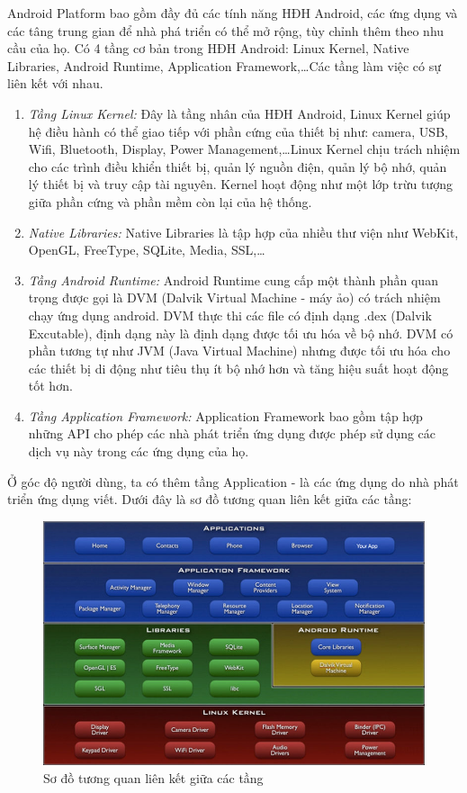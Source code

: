 Android Platform bao gồm đầy đủ các tính năng HĐH Android, các ứng dụng và các tâng trung gian để nhà phá triển có thể mở rộng, tùy chỉnh thêm theo nhu cầu của họ. Có 4 tầng cơ bản trong HĐH Android: Linux Kernel, Native Libraries, Android Runtime, Application Framework,\dots Các tầng làm việc có sự liên kết với nhau.
\begin{enumerate}
    \item{\textit{Tầng Linux Kernel:}}
    Đây là tầng nhân của HĐH Android, Linux Kernel giúp hệ điều hành có thể giao tiếp với phần cứng của thiết bị như: camera,  USB, Wifi, Bluetooth, Display, Power Management,\dots  Linux Kernel chịu trách nhiệm cho các trình điều khiển thiết bị, quản lý nguồn điện, quản lý bộ nhớ, quản lý thiết bị và truy cập tài nguyên. Kernel hoạt động như một lớp trừu tượng giữa phần cứng và phần mềm còn lại của hệ thống.
    \item{\textit{Native Libraries:}}
    Native Libraries là tập hợp của nhiều thư viện như WebKit, OpenGL, FreeType, SQLite, Media, SSL,\dots 
    \item{\textit{Tầng Android Runtime:}}
    Android Runtime cung cấp một thành phần quan trọng được gọi là DVM (Dalvik Virtual Machine - máy ảo) có trách nhiệm chạy ứng dụng android.
    DVM thực thi các file có định dạng .dex (Dalvik Excutable), định dạng này là định dạng được tối ưu hóa về bộ nhớ.
    \newline
    DVM có phần tương tự như JVM (Java Virtual Machine) nhưng được tối ưu hóa cho các thiết bị di động như tiêu thụ ít bộ nhớ hơn và tăng hiệu suất hoạt động tốt hơn.
    \item{\textit{Tầng Application Framework:}}
    Application Framework bao gồm tập hợp những API cho phép các nhà phát triển ứng dụng được phép sử dụng các dịch vụ này trong các ứng dụng của họ.
\end{enumerate}
Ở góc độ người dùng, ta có thêm tầng Application - là các ứng dụng do nhà phát triển ứng dụng viết. Dưới đây là sơ đồ tương quan liên kết giữa các tầng:
\newline
\begin{figure}[!ht]
    \centering
    \includegraphics[scale=0.5]{images/android-flatform.jpg}
    \caption{Sơ đồ tương quan liên kết giữa các tầng}
\end{figure}


